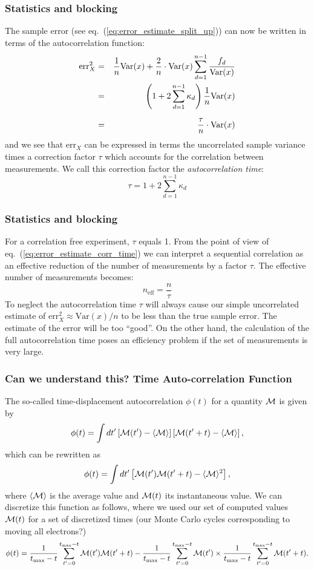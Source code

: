 \documentclass[compress]{beamer}
\newcommand{\be}{\begin{equation}}
\newcommand{\ee}{\end{equation}}
\newcommand{\bea}{\begin{eqnarray}}
\newcommand{\eea}{\end{eqnarray}}
\newcommand{\bdm}{\begin{displaymath}}
\newcommand{\edm}{\end{displaymath}}
\newcommand{\var}[0]{\mathrm{Var}}   %
\newcommand{\be}{\begin{equation}}                        %
\newcommand{\ee}{\end{equation}}                          %
\begin{document}
\frame
{
  \frametitle{Statistics and blocking}
\begin{small}
{\scriptsize
The sample error (see eq.~(\ref{eq:error_estimate_split_up})) can now be
written in terms of the autocorrelation function:
\bea
\mathrm{err}_X^2 &=&
\frac{1}{n}\var(x)+\frac{2}{n}\cdot\var(x)\sum_{d=1}^{n-1}
\frac{f_d}{\var(x)}\nonumber\\ &=&
\left(1+2\sum_{d=1}^{n-1}\kappa_d\right)\frac{1}{n}\var(x)\nonumber\\
&=&\rule{0pt}{17pt}
\frac{\tau}{n}\cdot\var(x)
\label{eq:error_estimate_corr_time}
\eea
and we see that $\mathrm{err}_X$ can be expressed in terms the
uncorrelated sample variance times a correction factor $\tau$ which
accounts for the correlation between measurements. We call this
correction factor the \emph{autocorrelation time}:
\be
\tau = 1+2\sum_{d=1}^{n-1}\kappa_d
\label{eq:autocorrelation_time}
\ee
}
\end{small}
}

\frame
{
  \frametitle{Statistics and blocking}
\begin{small}
{\scriptsize
For a correlation free experiment, $\tau$
equals 1. From the point of view of
eq.~(\ref{eq:error_estimate_corr_time}) we can interpret a sequential
correlation as an effective reduction of the number of measurements by
a factor $\tau$. The effective number of measurements becomes:
\bdm
n_\mathrm{eff} = \frac{n}{\tau}
\edm
To neglect the autocorrelation time $\tau$ will always cause our
simple uncorrelated estimate of $\mathrm{err}_X^2\approx \var(x)/n$ to
be less than the true sample error. The estimate of the error will be
too ``good''. On the other hand, the calculation of the full
autocorrelation time poses an efficiency problem if the set of
measurements is very large.
}
\end{small}
}




\frame
{
  \frametitle{Can we understand this? Time Auto-correlation Function}
\begin{small}
{\scriptsize
The so-called time-displacement autocorrelation $\phi(t)$ for a quantity ${\cal M}$ is given by
\[
\phi(t) = \int dt' \left[{\cal M}(t')-\langle {\cal M} \rangle\right]\left[{\cal M}(t'+t)-\langle {\cal M} \rangle\right],
\]
which can be rewritten as 
\[
\phi(t) = \int dt' \left[{\cal M}(t'){\cal M}(t'+t)-\langle {\cal M} \rangle^2\right],
\]
where $\langle {\cal M} \rangle$ is the average value and
${\cal M}(t)$ its instantaneous value. We can discretize this function as follows, where we used our
set of computed values ${\cal M}(t)$ for a set of discretized times (our Monte Carlo cycles corresponding to moving all electrons?)
\[
\phi(t)  = \frac{1}{t_{\mathrm{max}}-t}\sum_{t'=0}^{t_{\mathrm{max}}-t}{\cal M}(t'){\cal M}(t'+t)
-\frac{1}{t_{\mathrm{max}}-t}\sum_{t'=0}^{t_{\mathrm{max}}-t}{\cal M}(t')\times
\frac{1}{t_{\mathrm{max}}-t}\sum_{t'=0}^{t_{\mathrm{max}}-t}{\cal M}(t'+t).\label{eq:phitf}
\]
}
\end{small}
}
\end{document}
